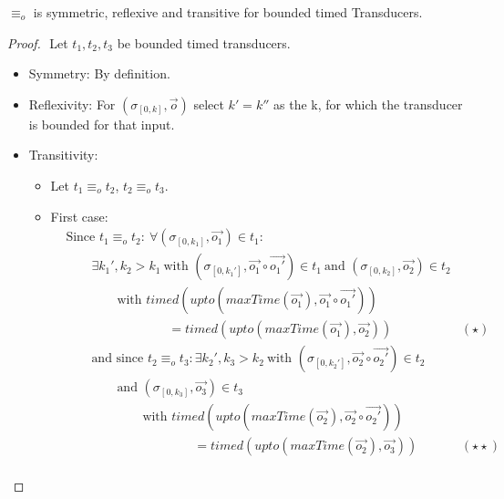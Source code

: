 \begin{lemma}[name=Observational Equivalence is an equivalence Relationship for bounded Transducers]\label{lemma:observational_equivalence_equivalence_relationship}
  \(\equiv_o\) is symmetric, reflexive and transitive for bounded timed Transducers.
\end{lemma}
\begin{proof}$ $\newline
  Let \(t_1, t_2, t_3\) be bounded timed transducers.
  \begin{itemize}
    \item Symmetry: By definition.
    \item Reflexivity: For \((\sigma_{[0,k]}, \vec{o})\) select \(k' = k''\) as the k, for which the transducer is bounded for that input.
    \item Transitivity:
      \begin{itemize}
        \item Let \(t_1 \equiv_o t_2\), \(t_2 \equiv_o t_3\).
        \item First case:
          \begin{align*}
            &\text{Since } t_1 \equiv_o t_2:\ \forall (\sigma_{[0,k_1]}, \vec{o_1}) \in t_1: \\
            &\hspace{2em} \exists k_1', k_2 > k_1\ \text{with } (\sigma_{[0,k_1']}, \vec{o_1}\circ\vec{o_1'}) \in t_1\ \text{and } (\sigma_{[0,k_2]}, \vec{o_2}) \in t_2 \\
            &\hspace{4em} \text{with } \mathit{timed}(\mathit{upto}(\mathit{maxTime}(\vec{o_1}),\vec{o_1} \circ \vec{o_1'} )) \\
            &\hspace{8em} = \mathit{timed}(\mathit{upto}(\mathit{maxTime}(\vec{o_1}),\vec{o_2})) & (\star)\\
            &\hspace{2em} \text{and since } t_2 \equiv_o t_3: \exists k_2', k_3 > k_2\ \text{with } (\sigma_{[0,k_2']}, \vec{o_2}\circ\vec{o_2'}) \in t_2 \\
            &\hspace{4em} \text{and } (\sigma_{[0,k_3]}, \vec{o_3}) \in t_3 \\
            &\hspace{6em} \text{with } \mathit{timed}(\mathit{upto}(\mathit{maxTime}(\vec{o_2}),\vec{o_2} \circ \vec{o_2'} )) \\
            &\hspace{10em} = \mathit{timed}(\mathit{upto}(\mathit{maxTime}(\vec{o_2}),\vec{o_3})) & (\star\star)\\

\end{align*}
\end{itemize}
\end{itemize}
\end{proof}
